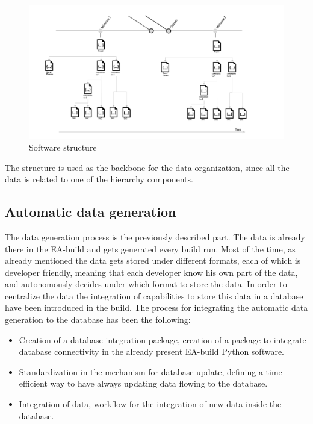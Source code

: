 \documentclass[../main.tex]{subfiles}
\begin{document}
\begin{figure}
    \centering
    \includegraphics[width=\linewidth]{images_folder/softwarestrucutre.png}
    \caption{Software structure}
    \label{fig:SWsTR}
\end{figure}
The structure is used as the backbone for the data organization, since all the data is related to one of the hierarchy components.
\subsection{Automatic data generation}
The data generation process is the previously described part. The data is already there in the EA-build and gets generated every build run. Most of the time, as already mentioned the data gets stored under different formats, each of which is developer friendly, meaning that each developer know his own part of the data, and autonomously decides under which format to store the data. 
In order to centralize the data the integration of capabilities to store this data in a database have been introduced in the build. The process for integrating the automatic data generation to the database has been the following:
\begin{itemize}
    \item Creation of a database integration package, creation of a package to integrate database connectivity in the already present EA-build Python software.
    \item Standardization in the mechanism for database update, defining a time efficient way to have always updating data flowing to the database. 
    \item Integration of data, workflow for the integration of new data inside the database.
\end{itemize}
\end{document}
